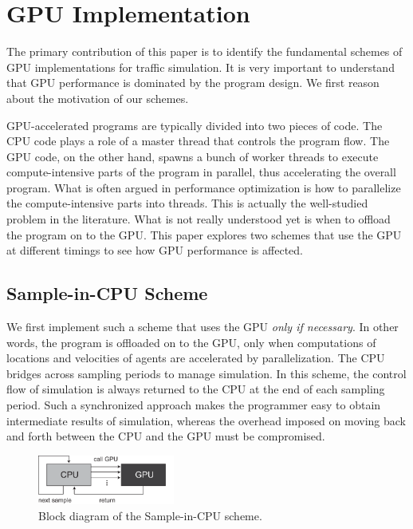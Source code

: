 \documentclass[times, 10pt, twocolumn]{article}
\begin{document}
\section{GPU Implementation}
\label{sec:gpu_implementations}

The primary contribution of this paper is to identify the fundamental
schemes of GPU implementations for traffic simulation.
It is very important to understand that GPU performance is dominated by
the program design.
We first reason about the motivation of our schemes.

GPU-accelerated programs are typically divided into two pieces of code.
The CPU code plays a role of a master thread that controls the program
flow.
The GPU code, on the other hand, spawns a bunch of worker threads to
execute compute-intensive parts of the program in parallel, thus
accelerating the overall program.
What is often argued in performance optimization is how to parallelize
the compute-intensive parts into threads.
This is actually the well-studied problem in the literature.
What is not really understood yet is when to offload the program on to
the GPU.
This paper explores two schemes that use the GPU at different timings to
see how GPU performance is affected.

\subsection{Sample-in-CPU Scheme}
\label{sec:sample-in-cpu}

We first implement such a scheme that uses the GPU \textit{only if
necessary}.
In other words, the program is offloaded on to the GPU, only when
computations of locations and velocities of agents are accelerated by
parallelization.
The CPU bridges across sampling periods to manage simulation.
In this scheme, the control flow of simulation is always returned to the
CPU at the end of each sampling period.
Such a synchronized approach makes the programmer easy to
obtain intermediate results of simulation, whereas the overhead imposed
on moving back and forth between the CPU and the GPU must be
compromised.

\begin{figure}[t]
\centering
\includegraphics[width=0.4\textwidth]{eps/sample-in-cpu.eps}
\caption{Block diagram of the Sample-in-CPU scheme.}
\label{fig:sample-in-cpu}
\end{figure}
\end{document}
